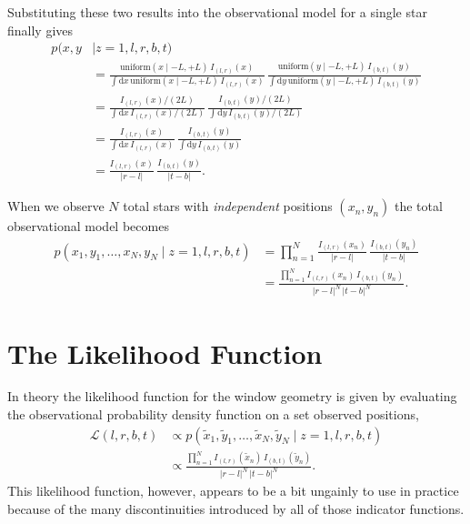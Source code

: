 \documentclass[
  letterpaper,
  DIV=11,
  numbers=noendperiod]{scrartcl}
\begin{document}
Substituting these two results into the observational model for a single
star finally gives \begin{align*}
p(x, y &\mid z = 1, l, r, b, t)
\\
&=
\frac{ \text{uniform}(x \mid -L, +L) \, I_{(l, r)}(x) }
{ \int \mathrm{d} x \, \text{uniform}(x \mid -L, +L) \, I_{(l, r)}(x) } \,
\frac{ \text{uniform}(y \mid -L, +L) \, I_{(b, t)}(y) }
{ \int \mathrm{d} y \, \text{uniform}(y \mid -L, +L) \, I_{(b, t)}(y) }
\\
&=
\frac{ I_{(l, r)}(x) / (2L) }{ \int \mathrm{d} x \, I_{(l, r)}(x) / (2L) } \,
\frac{ I_{(b, t)}(y) / (2L) }{ \int \mathrm{d} y \, I_{(b, t)}(y) / (2L) }
\\
&=
\frac{ I_{(l, r)}(x) }{ \int \mathrm{d} x \, I_{(l, r)}(x) } \,
\frac{ I_{(b, t)}(y) }{ \int \mathrm{d} y \, I_{(b, t)}(y) }
\\
&=
\frac{ I_{(l, r)}(x) }{ | r - l | } \,
\frac{ I_{(b, t)}(y) }{ | t - b | }.
\end{align*}

When we observe \(N\) total stars with \emph{independent} positions
\((x_{n}, y_{n})\) the total observational model becomes \begin{align*}
p(x_{1}, y_{1}, \ldots, x_{N}, y_{N} \mid z = 1, l, r, b, t)
&=
\prod_{n = 1}^{N} \frac{ I_{(l, r)}(x_{n}) }{ | r - l | } \,
                  \frac{ I_{(b, t)}(y_{n}) }{ | t - b | }
\\
&=
\frac{ \prod_{n = 1}^{N} I_{(l, r)}(x_{n}) \, I_{(b, t)}(y_{n}) }
{ | r - l |^{N} \, | t - b |^{N} }.
\end{align*}

\section{The Likelihood Function}\label{the-likelihood-function}

In theory the likelihood function for the window geometry is given by
evaluating the observational probability density function on a set
observed positions, \begin{align*}
\mathcal{L}(l, r, b, t)
&\propto
p(\tilde{x}_{1}, \tilde{y}_{1}, \ldots, \tilde{x}_{N}, \tilde{y}_{N} \mid
  z = 1, l, r, b, t)
\\
&\propto
\frac{
  \prod_{n = 1}^{N} I_{(l, r)}( \tilde{x}_{n}) \, I_{(b, t)}( \tilde{y}_{n})
}
{
  | r - l |^{N} \, | t - b |^{N}
}.
\end{align*} This likelihood function, however, appears to be a bit
ungainly to use in practice because of the many discontinuities
introduced by all of those indicator functions.
\end{document}
